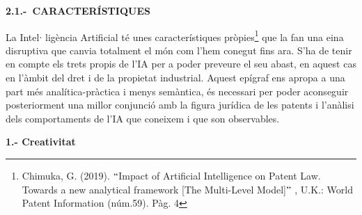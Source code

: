 \documentclass[12pt]{article}
\begin{document}
\vspace{\baselineskip}
\begin{justify}
\textbf{2.1.-\  CARACTERÍSTIQUES}
\end{justify}\par


\vspace{\baselineskip}
\begin{justify}
La Intel$ \cdot $ ligència Artificial té unes característiques pròpies\footnote{ Chimuka, G. (2019). $``$Impact of Artificial Intelligence on Patent Law. Towards a new analytical framework [The Multi-Level Model]$"$ , U.K.: World Patent Information (núm.59). Pàg. 4 } que la fan una eina disruptiva que canvia totalment el món com l’hem conegut fins ara. S’ha de tenir en compte els trets propis de l’IA per a poder preveure el seu abast, en aquest cas en l’àmbit del dret i de la propietat industrial. Aquest epígraf ens apropa a una part més analítica-pràctica i menys semàntica, és necessari per poder aconseguir posteriorment una millor conjunció amb la figura jurídica de les patents i l’anàlisi dels comportaments de l’IA que coneixem i que son observables. 
\end{justify}\par


\vspace{\baselineskip}
\textbf{1.- Creativitat}\par
\end{document}
